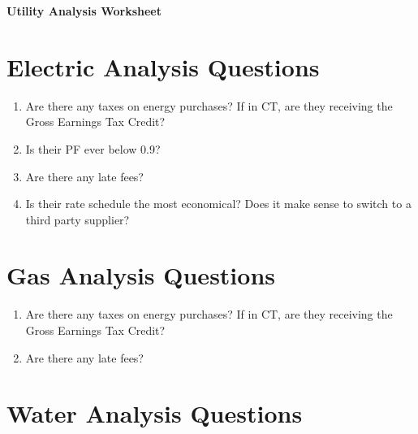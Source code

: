 \documentclass[./main.tex]{subfiles}
\begin{document}
\begin{center}
\Large\textbf{Utility Analysis Worksheet}
\end{center}


\section*{Electric Analysis Questions}

\begin{enumerate}[leftmargin=*]
\item Are there any taxes on energy purchases? If in CT, are they receiving the Gross Earnings Tax Credit?

\vspace{\answerspace}

\item Is their PF ever below 0.9?

\vspace{\answerspace}

\item Are there any late fees? 

\vspace{\answerspace}

\item Is their rate schedule the most economical? Does it make sense to switch to a third party supplier? 

\vspace{\answerspace}

\end{enumerate}

\section*{Gas Analysis Questions}

\begin{enumerate}[leftmargin=*]
\item Are there any taxes on energy purchases? If in CT, are they receiving the Gross Earnings Tax Credit?

\vspace{\answerspace}

\item Are there any late fees? 

\vspace{\answerspace}

\end{enumerate}

\clearpage 

\section*{Water Analysis Questions}
\end{document}
